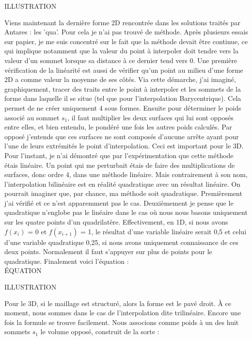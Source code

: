 ILLUSTRATION

Viens maintenant la dernière forme 2D rencontrée dans les solutions traités par Antares : les 'qua'. Pour cela je n'ai pas trouvé de méthode. Après plusieurs essais sur papier, je me suis concentré sur le fait que la méthode devait être continue, ce qui implique notamment que la valeur du point à interpoler doit tendre vers la valeur d'un sommet lorsque sa distance à ce dernier tend vers 0. Une première vérification de la linéarité est aussi de vérifier qu'un point au milieu d'une forme 2D a comme valeur la moyenne de ses côtés.
Via cette démarche, j'ai imaginé, graphiquement, tracer des traits entre le point à interpoler et les sommets de la forme dans laquelle il se situe (tel que pour l'interpolation Barycentrique). Cela permet de ne créer uniquement 4 sous formes. Ensuite pour déterminer le poids associé au sommet \( s_1 \), il faut multiplier les deux surfaces qui lui sont opposés entre elles, et bien entendu, le pondéré une fois les autres poids calculés. Par opposé j'entends que ces surfaces ne sont composés d'aucune arrête ayant pour l'une de leurs extrémités le point d'interpolation. Ceci est important pour le 3D. Pour l'instant, je n'ai démontré que par l'expérimentation que cette méthode étais linéaire. Un point qui me perturbait étais de faire des multiplications de surfaces, donc ordre 4, dans une méthode linéaire. Mais contrairement à son nom, l'interpolation bilinéaire est en réalité quadratique avec un résultat linéaire. On pourrait imaginer que, par chance, ma méthode soit quadratique. Premièrement j'ai vérifié et ce n'est apparemment pas le cas. Deuxièmement je pense que le quadratique n'englobe pas le linéaire dans le cas où nous nous basons uniquement sur les quatre points d'un quadrilatère. Effectivement, en 1D, si nous avons \(f(x_i)\) = 0 et \(f(x_{i+1})\) = 1, le résultat d'une variable linéaire serait 0,5 et celui d'une variable quadratique 0,25, si nous avons uniquement connaissance de ces deux points. Normalement il faut s'appuyer sur plus de points pour le quadratique. Finalement voici l'équation :\\
ÉQUATION

ILLUSTRATION\vspace{0.5cm}  %

Pour le 3D, si le maillage est structuré, alors la forme est le pavé droit. À ce moment, nous sommes dans le cas de l'interpolation dite trilinéaire. Encore une fois la formule se trouve facilement. Nous associons comme poids à un des huit sommets \( s_1 \) le volume opposé, construit de la sorte :

